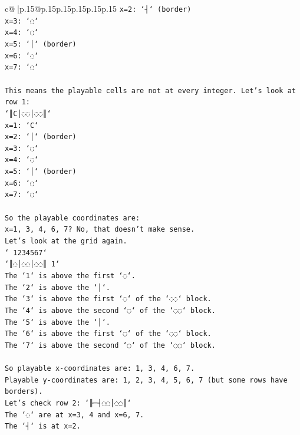 \documentclass{article}
\begin{document}
{\begin{supertabular}{c@{$\;$}|p{.15\linewidth}@{}p{.15\linewidth}p{.15\linewidth}p{.15\linewidth}p{.15\linewidth}p{.15\linewidth}}
{{{\texttt{x=2: `┤` (border)} \\
\texttt{x=3: `◌`} \\
\texttt{x=4: `◌`} \\
\texttt{x=5: `│` (border)} \\
\texttt{x=6: `◌`} \\
\texttt{x=7: `◌`} \\
\\ 
\texttt{This means the playable cells are not at every integer. Let's look at row 1:} \\
\texttt{`║C│◌◌│◌◌║`} \\
\texttt{x=1: `C`} \\
\texttt{x=2: `│` (border)} \\
\texttt{x=3: `◌`} \\
\texttt{x=4: `◌`} \\
\texttt{x=5: `│` (border)} \\
\texttt{x=6: `◌`} \\
\texttt{x=7: `◌`} \\
\\ 
\texttt{So the playable coordinates are:} \\
\texttt{x=1, 3, 4, 6, 7? No, that doesn't make sense.} \\
\texttt{Let's look at the grid again.} \\
\texttt{` 1234567`} \\
\texttt{`║◌│◌◌│◌◌║ 1`} \\
\texttt{The `1` is above the first `◌`.} \\
\texttt{The `2` is above the `│`.} \\
\texttt{The `3` is above the first `◌` of the `◌◌` block.} \\
\texttt{The `4` is above the second `◌` of the `◌◌` block.} \\
\texttt{The `5` is above the `│`.} \\
\texttt{The `6` is above the first `◌` of the `◌◌` block.} \\
\texttt{The `7` is above the second `◌` of the `◌◌` block.} \\
\\ 
\texttt{So playable x{-}coordinates are: 1, 3, 4, 6, 7.} \\
\texttt{Playable y{-}coordinates are: 1, 2, 3, 4, 5, 6, 7 (but some rows have borders).} \\
\texttt{Let's check row 2: `╟─┤◌◌│◌◌║`} \\
\texttt{The `◌` are at x=3, 4 and x=6, 7.} \\
\texttt{The `┤` is at x=2.} \\
}}}
\end{supertabular}}
\end{document}

